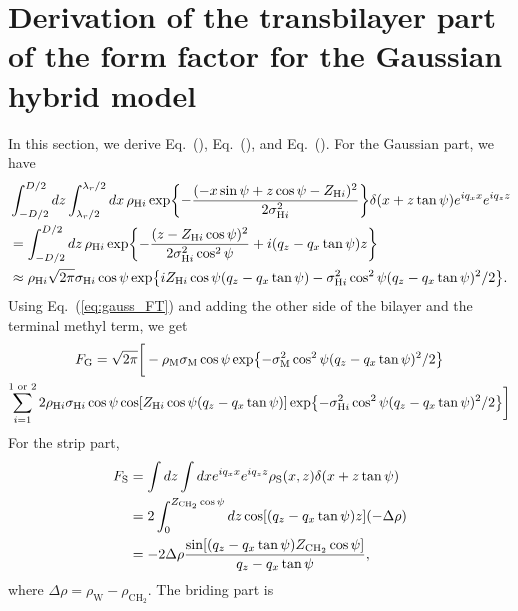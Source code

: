 \documentclass[12pt,letterpaper]{article}
\newcommand{\zh}[1]{Z_{\mathrm{H}#1}}
\newcommand{\zchtwo}{Z_\mathrm{CH_2}}
\newcommand{\sigmah}[1]{\sigma_{\mathrm{H}#1}}
\newcommand{\sigmam}{\sigma_\mathrm{M}}
\newcommand{\rhoh}[1]{\rho_{\mathrm{H}#1}}
\newcommand{\rhom}{\rho_\mathrm{M}}
\newcommand{\rhos}{\rho_\mathrm{S}}
\newcommand{\rhow}{\rho_\mathrm{W}}
\newcommand{\rhochtwo}{\rho_\mathrm{CH_2}}
\begin{document}
\section{Derivation of the transbilayer part of the form factor for the 
Gaussian hybrid model}
In this section, we derive Eq.~(), Eq.~(), and Eq.~().
For the Gaussian part, we have
\begin{align}
  & \int_{-D/2}^{D/2} dz \int_{\lambda_r/2}^{\lambda_r/2} \mathop{dx}
  \rhoh{i} \, \mathrm{exp}\braces{-\frac{(-x\sin\psi+z\cos\psi-\zh{i})^2}{2\sigmah{i}^2}}
  \delta(x+z\tan\psi)e^{iq_xx}e^{iq_zz} \nonumber\\
  &= \int_{-D/2}^{D/2} \mathop{dz}\rhoh{i} \,\mathrm{exp}\braces{
    -\frac{(z-\zh{i}\cos\psi)^2}{2\sigmah{i}^2\cos^2\psi} + i(q_z-q_x\tan\psi)z
  } \nonumber\\
  &\approx \rhoh{i}\sqrt{2\pi}\sigmah{i}\cos\psi \,\mathrm{exp}
  \braces{
    i\zh{i}\cos\psi(q_z-q_x\tan\psi) - \sigmah{i}^2\cos^2\psi(q_z-q_x\tan\psi)^2/2
  }. \label{eq:gauss_FT}
\end{align}
Using Eq.~(\ref{eq:gauss_FT}) and adding the other side of the bilayer and
the terminal methyl term, we get
\begin{multline}
  F_\mathrm{G} = \sqrt{2\pi}
  \bigg[
    -\rhom\sigmam\cos\psi \,\mathrm{exp}\braces{
      -\sigmam^2\cos^2\psi(q_z-q_x\tan\psi)^2/2} \\
    \sum_{i=1}^{1\text{ or }2}2\rhoh{i}\sigmah{i}\cos\psi
    \cos\bracks{\zh{i}\cos\psi(q_z-q_x\tan\psi)}
    \,\mathrm{exp}\braces{-\sigmah{i}^2\cos^2\psi(q_z-q_x\tan\psi)^2/2}
  \bigg]
\end{multline}
For the strip part, 
\begin{align}
  F_\mathrm{S} 
  &= \int dz \int dx e^{iq_xx}e^{iq_zz}\rhos(x,z)\delta(x+z\tan\psi) \\
  &= 2 \int_0^{\zchtwo\cos\psi}dz\cos\bracks{(q_z-q_x\tan\psi)z}(-\Delta\rho) \\
  &= -2\Delta\rho\frac{\sin\bracks{(q_z-q_x\tan\psi)\zchtwo\cos\psi}}{q_z-q_x\tan\psi},
\end{align}
where $\Delta\rho=\rhow-\rhochtwo$. The briding part is



\end{document}
